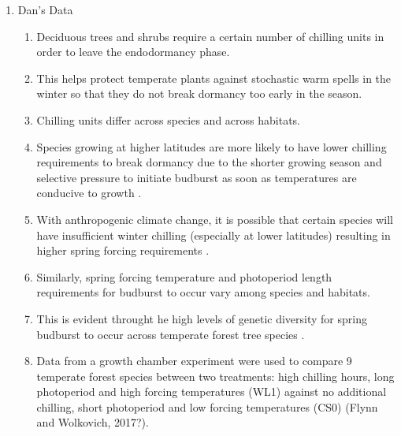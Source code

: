 \documentclass{article}\usepackage[]{graphicx}\usepackage[]{color}
\begin{document}
\begin{enumerate}
\item Dan's Data
\begin{enumerate}
\item Deciduous trees and shrubs require a certain number of chilling units in order to leave the endodormancy phase. 
\item This helps protect temperate plants against stochastic warm spells in the winter so that they do not break dormancy too early in the season.
\item Chilling units differ across species and across habitats.
\item Species growing at higher latitudes are more likely to have lower chilling requirements to break dormancy \citep{Myking1995, Howe2003} due to the shorter growing season and selective pressure to initiate budburst as soon as temperatures are conducive to growth \citep{Prevey2017}. %
\item With anthropogenic climate change, it is possible that certain species will have insufficient winter chilling (especially at lower latitudes) resulting in higher spring forcing requirements \citep{McCreary1990, Morin2009, Fu2012, Polgar2014, Chuine2010}.
\item Similarly, spring forcing temperature and photoperiod length requirements for budburst to occur vary among species and habitats.
\item This is evident throught he high levels of genetic diversity for spring budburst to occur across temperate forest tree species \citep{Chuine2001}.
\item Data from a growth chamber experiment were used to compare 9 temperate forest species between two treatments: high chilling hours, long photoperiod and high forcing temperatures (WL1) against no additional chilling, short photoperiod and low forcing temperatures (CS0) (Flynn and Wolkovich, 2017?).


\end{enumerate}
\end{enumerate}
\end{document}
